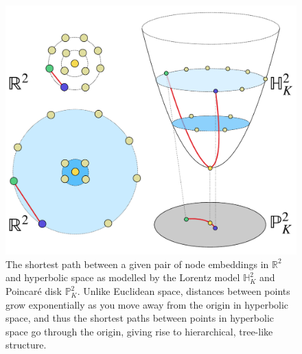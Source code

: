 \begin{figure}
    \centering
    \vspace{-10pt}
    \includegraphics[width=0.9\linewidth]{explanatory_fig.pdf}
    \vspace{-10pt}
    \caption{The shortest path between a given pair of node embeddings in $\mathbb{R}^2$ and hyperbolic space as modelled by the Lorentz model $\mathbb{H}^2_K$ and Poincar\'e disk $\mathbb{P}^2_K$. Unlike Euclidean space, distances between points grow exponentially as you move away from the origin in hyperbolic space, and thus the shortest paths between points in hyperbolic space go through the origin, giving rise to hierarchical, tree-like structure. }
    \vspace{-10pt}
    \label{fig:explanatory_fig_1}
\end{figure}

